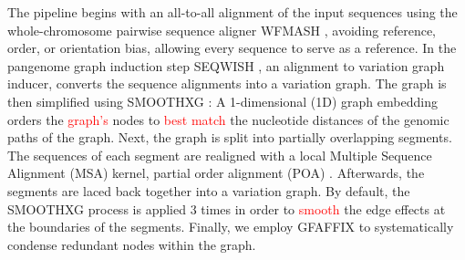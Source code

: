 \documentclass{bioinfo}
\theoremstyle{definition}
\newcommand{\red}[1]{{\textcolor{Red}{#1}}}
\begin{document}
	The pipeline begins with an all-to-all alignment of the input sequences using the whole-chromosome pairwise sequence aligner WFMASH \citep{wfmash}, avoiding reference, order, or orientation bias, allowing every sequence to serve as a reference.
	In the pangenome graph induction step SEQWISH \citep{Garrison2022}, an alignment to variation graph inducer, converts the sequence alignments into a variation graph. 
	The graph is then simplified using SMOOTHXG \citep{Garrison2023}:
	A 1-dimensional (1D) graph embedding \citep{Heumos2024} orders the \red{graph’s} nodes to \red{best match} the nucleotide distances of the genomic paths of the graph.
	Next, the graph is split into partially overlapping segments. 
	The sequences of each segment are realigned with a local Multiple Sequence Alignment (MSA) kernel, partial order alignment (POA) \citep{Lee2002}.
	Afterwards, the segments are laced back together into a variation graph. 
	By default, the SMOOTHXG process is applied 3 times in order to \red{smooth} the edge effects at the boundaries of the segments.
	Finally, we employ GFAFFIX \citep{Liao2023} to systematically condense redundant nodes within the graph.
	
\end{document}

